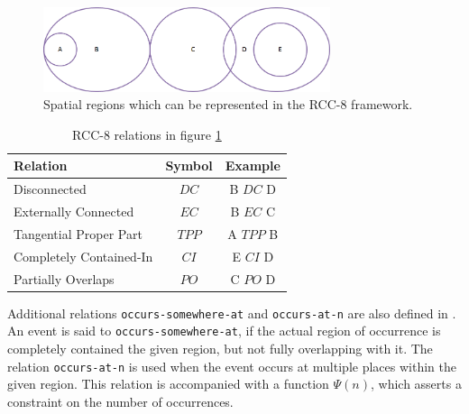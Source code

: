 \begin{figure}[h]
\centering
\includegraphics[width=0.75\textwidth]{media/chapter2/rcc8-combined.png}
\caption{Spatial regions which can be represented in the RCC-8 framework.}
\label{fig:rcc8}
\end{figure}

\begin{table}[h]
 \centering
 \begin{tabular}{ | l | c | c |}
  \hline
  \textbf{Relation} & \textbf{Symbol} & \textbf{Example} \\ \hline
    Disconnected & $DC$ & B $DC$ D \\ \hline
    Externally Connected & $EC$ & B $EC$ C \\ \hline
    Tangential Proper Part & $TPP$ & A $TPP$ B \\ \hline
    Completely Contained-In & $CI$ & E $CI$ D \\ \hline
    Partially Overlaps & $PO$ & C $PO$ D \\ \hline
  \end{tabular}
 \caption{RCC-8 relations in figure \ref{fig:rcc8}}
\end{table}

Additional relations \texttt{occurs-somewhere-at} and \texttt{occurs-at-n} are also defined in \cite{gupta2011managing}. An event is said to \texttt{occurs-somewhere-at}, if the actual region of occurrence is completely contained the given region, but not fully overlapping with it. The relation \texttt{occurs-at-n} is used when the event occurs at multiple places within the given region. This relation is accompanied with a function $\Psi(n)$, which asserts a constraint on the number of occurrences. 

